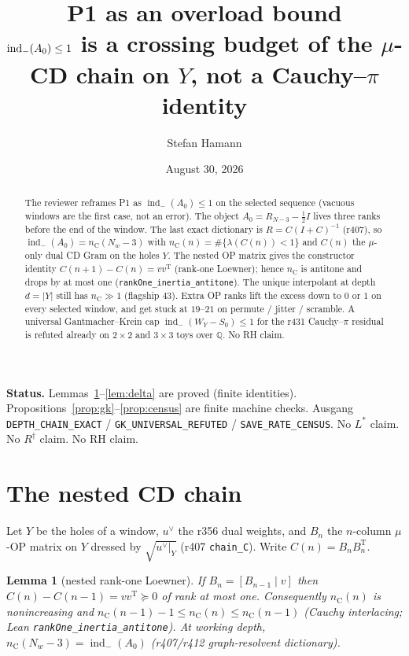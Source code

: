 \documentclass[11pt]{article}
\title{\bfseries P1 as an overload bound\\[2mm]
\large $\indm(A_0)\le 1$ is a crossing budget of the
$\mu$-CD chain on $Y$, not a Cauchy--$\pi$ identity}
\author{Stefan Hamann}
\date{August 30, 2026}
\newtheorem{lemma}{Lemma}
\theoremstyle{remark}
\newcommand{\indm}{\operatorname{ind}_{-}}
\newcommand{\nC}{n_{\mathrm{C}}}
\begin{document}
\maketitle

\begin{abstract}\noindent
The reviewer reframes P1 as $\indm(A_0)\le 1$ on the
selected sequence (vacuous windows are the first case,
not an error).
The object $A_0=R_{N-3}-\tfrac12 I$ lives three ranks
before the end of the window.
The last exact dictionary is $R=C(I+C)^{-1}$ (r407), so
$\indm(A_0)=\nC(N_w-3)$ with $\nC(n)=\#\{\lambda(C(n))<1\}$
and $C(n)$ the $\mu$-only dual CD Gram on the holes $Y$.
The nested OP matrix gives the constructor identity
$C(n+1)-C(n)=vv^{\mathrm{T}}$ (rank-one Loewner); hence
$\nC$ is antitone and drops by at most one
(\texttt{rankOne\_inertia\_antitone}).
The unique interpolant at depth $d=|Y|$ still has
$\nC\gg 1$ (flagship $43$).
Extra OP ranks lift the excess down to $0$ or $1$ on
every selected window, and get stuck at $19$--$21$ on
permute / jitter / scramble.
A universal Gantmacher--Krein cap $\indm(W_Y-S_0)\le 1$
for the r431 Cauchy--$\pi$ residual is refuted already
on $2\times 2$ and $3\times 3$ toys over $\mathbb{Q}$.
No RH claim.
\end{abstract}

\medskip\noindent
\textbf{Status.}\enspace
Lemmas~\ref{lem:nested}--\ref{lem:delta} are proved
(finite identities).
Propositions~\ref{prop:gk}--\ref{prop:census} are finite
machine checks.
Ausgang \texttt{DEPTH\_CHAIN\_EXACT} /
\texttt{GK\_UNIVERSAL\_REFUTED} /
\texttt{SAVE\_RATE\_CENSUS}.
No $L^*$ claim.  No $R^{\dagger}$ claim.  No RH claim.

\section{The nested CD chain}\label{sec:cd}

Let $Y$ be the holes of a window, $u^{\vee}$ the r356
dual weights, and $B_n$ the $n$-column $\mu$-OP matrix
on $Y$ dressed by $\sqrt{u^{\vee}|_Y}$ (r407
\texttt{chain\_C}).
Write $C(n)=B_n B_n^{\mathrm{T}}$.

\begin{lemma}[nested rank-one Loewner]\label{lem:nested}
If $B_{n}=[B_{n-1}\mid v]$ then
$C(n)-C(n-1)=vv^{\mathrm{T}}\succeq 0$ of rank at most one.
Consequently $\nC(n)$ is nonincreasing and
$\nC(n-1)-1\le \nC(n)\le \nC(n-1)$
(Cauchy interlacing; Lean
\texttt{rankOne\_inertia\_antitone}).
At working depth, $\nC(N_w-3)=\indm(A_0)$ (r407/r412
graph-resolvent dictionary).
\end{lemma}
\end{document}
